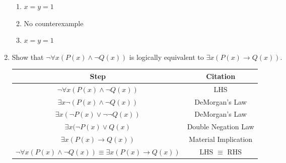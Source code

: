 \begin{enumerate}
    \vspace{2mm}
    \begin{solution}
    \begin{enumerate}
        \item $x = y = 1$
        \item No counterexample
        \item $x = y = 1$
    \end{enumerate}
    \end{solution}
    
    \item{Show that $\neg \forall x(P(x) \land \neg Q(x))$ is logically equivalent to $\exists x (P(x) \rightarrow Q(x))$}. 

    \vspace{2mm}
    \begin{solution}
    \begin{tabular}{c|c}
        Step & Citation \\
        \hline
        $\neg \forall x (P(x) \land \neg Q(x))$ & LHS \\
        $\exists x \neg (P(x) \land \neg Q(x))$ & DeMorgan's Law \\
        $\exists x (\neg P(x) \lor \neg \neg Q(x))$ & DeMorgan's Law \\
        $\exists x (\neg P(x) \lor Q(x)$ & Double Negation Law \\
        $\exists x (P(x) \rightarrow Q(x))$ & Material Implication \\
        $\neg \forall x (P(x) \land \neg Q(x)) \equiv \exists x (P(x) \rightarrow Q(x))$ & LHS $\equiv$ RHS \\
    \end{tabular}
    \end{solution}
    
    
\end{enumerate}
